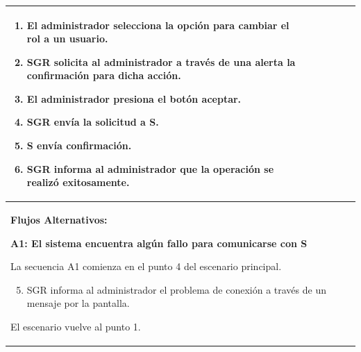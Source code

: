 \begin{longtable}{|l|p{5.5cm}|l|p{2cm}|l|p{1.9cm}|}
{					\begin{enumerate}
							\item El administrador selecciona la opción para cambiar el rol a un usuario.
							\item SGR solicita al administrador a través de una alerta la confirmación para dicha acción.
							\item El administrador presiona el botón aceptar.
							\item SGR envía la solicitud a S.
							\item S envía confirmación.
							\item SGR informa al administrador que la operación se realizó exitosamente.
					\end{enumerate}

					} \\ \hline

					\multicolumn{6}{|p{15cm}|}{ \textbf{Flujos Alternativos: }
					
					\textbf{A1: El sistema encuentra algún fallo para comunicarse con S}
					
					La secuencia A1 comienza en el punto 4 del escenario principal.
					\begin{enumerate}
							\setcounter{enumi}{4}
							\item SGR informa al administrador el problema de conexión a través de un mensaje por la pantalla.
					\end{enumerate}

					El escenario vuelve al punto 1.

					} \\ \hline

			\end{longtable}

